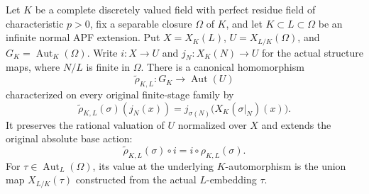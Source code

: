 \begin{theorem}
\label{fw:separable-union-absolute-action}
\leanok
Let $K$ be a complete discretely valued field with perfect residue field
of characteristic $p>0$, fix a separable closure $\Omega$ of $K$, and let
$K\subset L\subset\Omega$ be an infinite normal APF extension.
Put $X=X_K(L)$, $U=X_{L/K}(\Omega)$, and
$G_K=\operatorname{Aut}_K(\Omega)$.
Write $i:X\longrightarrow U$ and $j_N:X_K(N)\longrightarrow U$
for the actual structure maps, where $N/L$ is finite in $\Omega$.
There is a canonical homomorphism
\[
 \widetilde\rho_{K,L}:G_K\longrightarrow\operatorname{Aut}(U)
\]
characterized on every original finite-stage family by
\[
 \widetilde\rho_{K,L}(\sigma)(j_N(x))
   =j_{\sigma(N)}\bigl(X_K(\sigma|_N)(x)\bigr).
\]
It preserves the rational valuation of $U$ normalized over $X$ and
extends the original absolute base action:
\[
 \widetilde\rho_{K,L}(\sigma)\circ i
    =i\circ\rho_{K,L}(\sigma).
\]
For $\tau\in\operatorname{Aut}_L(\Omega)$, its value at the underlying
$K$-automorphism is the union map $X_{L/K}(\tau)$ constructed from the
actual $L$-embedding $\tau$.
\end{theorem}
